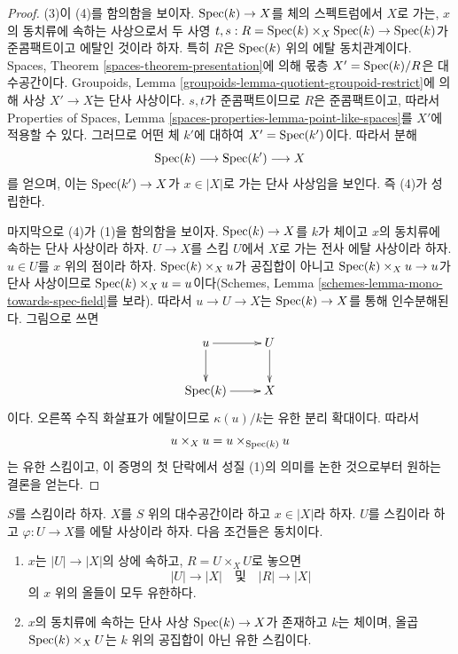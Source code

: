 \begin{proof}
\medskip\noindent
(3)이 (4)를 함의함을 보이자. $\mathop{\mathrm{Spec}}(k) \to X$를 체의 스펙트럼에서
$X$로 가는, $x$의 동치류에 속하는 사상으로서 두 사영
$t, s : R = \mathop{\mathrm{Spec}}(k) \times_X \mathop{\mathrm{Spec}}(k)  \to \mathop{\mathrm{Spec}}(k)$가 준콤팩트이고
에탈인 것이라 하자. 특히 $R$은 $\mathop{\mathrm{Spec}}(k)$ 위의 에탈 동치관계이다.
Spaces, Theorem \ref{spaces-theorem-presentation}에 의해 몫층
$X' = \mathop{\mathrm{Spec}}(k)/R$은 대수공간이다. Groupoids, Lemma
\ref{groupoids-lemma-quotient-groupoid-restrict}에 의해 사상 $X' \to X$는
단사 사상이다. $s, t$가 준콤팩트이므로 $R$은 준콤팩트이고, 따라서
Properties of Spaces, Lemma
\ref{spaces-properties-lemma-point-like-spaces}를 $X'$에 적용할 수 있다.
그러므로 어떤 체 $k'$에 대하여 $X' = \mathop{\mathrm{Spec}}(k')$이다. 따라서 분해
$$
\mathop{\mathrm{Spec}}(k) \longrightarrow
\mathop{\mathrm{Spec}}(k') \longrightarrow X
$$
를 얻으며, 이는 $\mathop{\mathrm{Spec}}(k') \to X$가 $x \in |X|$로 가는 단사 사상임을
보인다. 즉 (4)가 성립한다.

\medskip\noindent
마지막으로 (4)가 (1)을 함의함을 보이자. $\mathop{\mathrm{Spec}}(k) \to X$를 $k$가
체이고 $x$의 동치류에 속하는 단사 사상이라 하자. $U \to X$를 스킴
$U$에서 $X$로 가는 전사 에탈 사상이라 하자. $u \in U$를 $x$ 위의
점이라 하자. $\mathop{\mathrm{Spec}}(k) \times_X u$가 공집합이 아니고
$\mathop{\mathrm{Spec}}(k) \times_X u \to u$가 단사 사상이므로
$\mathop{\mathrm{Spec}}(k) \times_X u = u$이다(Schemes, Lemma
\ref{schemes-lemma-mono-towards-spec-field}를 보라). 따라서
$u \to U \to X$는 $\mathop{\mathrm{Spec}}(k) \to X$를 통해 인수분해된다. 그림으로 쓰면
$$
\xymatrix{
u \ar[r] \ar[d] & U \ar[d] \\
\Spec(k) \ar[r] & X
}
$$
이다. 오른쪽 수직 화살표가 에탈이므로 $\kappa(u)/k$는 유한 분리 확대이다.
따라서
$$
u \times_X u = u \times_{\mathop{\mathrm{Spec}}(k)} u
$$
는 유한 스킴이고, 이 증명의 첫 단락에서 성질 (1)의 의미를 논한 것으로부터
원하는 결론을 얻는다.
\end{proof}

\begin{lemma}
\label{lemma-weak-UR-finite-above-x}
$S$를 스킴이라 하자. $X$를 $S$ 위의 대수공간이라 하고
$x \in |X|$라 하자.
$U$를 스킴이라 하고 $\varphi : U \to X$를 에탈 사상이라 하자.
다음 조건들은 동치이다.
\begin{enumerate}
\item $x$는 $|U| \to |X|$의 상에 속하고, $R = U \times_X U$로 놓으면
$$
|U| \longrightarrow |X|
\quad\text{및}\quad
|R| \longrightarrow |X|
$$
의 $x$ 위의 올들이 모두 유한하다.
\item $x$의 동치류에 속하는 단사 사상 $\mathop{\mathrm{Spec}}(k) \to X$가 존재하고
$k$는 체이며, 올곱 $\mathop{\mathrm{Spec}}(k) \times_X U$는 $k$ 위의 공집합이 아닌
유한 스킴이다.
\end{enumerate}
\end{lemma}

